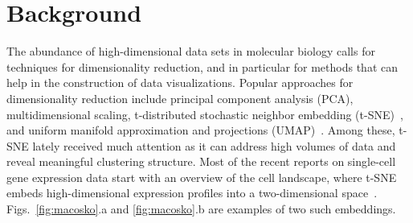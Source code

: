 \documentclass[twocolumn]{bmcart}
\begin{document}


\section*{Background}

The abundance of high-dimensional data sets in molecular biology calls for
techniques for dimensionality reduction, and in particular for methods that can
help in the construction of data visualizations. Popular approaches for
dimensionality reduction include principal component analysis (PCA),
multidimensional scaling, t-distributed stochastic neighbor embedding
(t-SNE)~\cite{maaten2008visualizing}, and uniform manifold approximation and
projections (UMAP)~\cite{2018arXivUMAP}. Among these, t-SNE lately received
much attention as it can address high volumes of data and reveal meaningful
clustering structure. Most of the recent reports on single-cell gene expression
data start with an overview of the cell landscape, where t-SNE embeds
high-dimensional expression profiles into a two-dimensional
space~\cite{macosko2015highly,cao2019single,tasic2018shared}.
Figs.~\ref{fig:macosko}.a and \ref{fig:macosko}.b are examples of two such
embeddings.
\end{document}
